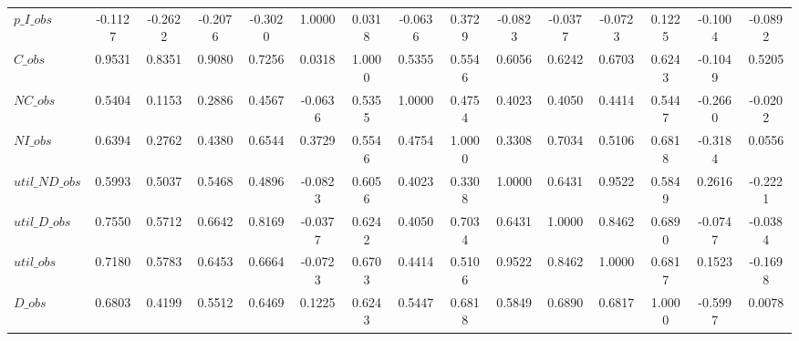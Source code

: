 \begin{center}
\begin{longtable}{lcccccccccccccc}
$p\_I\_obs      $	 & 	          -0.1127	 & 	          -0.2622	 & 	          -0.2076	 & 	          -0.3020	 & 	           1.0000	 & 	           0.0318	 & 	          -0.0636	 & 	           0.3729	 & 	          -0.0823	 & 	          -0.0377	 & 	          -0.0723	 & 	           0.1225	 & 	          -0.1004	 & 	          -0.0892 \\ 
$C\_obs         $	 & 	           0.9531	 & 	           0.8351	 & 	           0.9080	 & 	           0.7256	 & 	           0.0318	 & 	           1.0000	 & 	           0.5355	 & 	           0.5546	 & 	           0.6056	 & 	           0.6242	 & 	           0.6703	 & 	           0.6243	 & 	          -0.1049	 & 	           0.5205 \\ 
$NC\_obs        $	 & 	           0.5404	 & 	           0.1153	 & 	           0.2886	 & 	           0.4567	 & 	          -0.0636	 & 	           0.5355	 & 	           1.0000	 & 	           0.4754	 & 	           0.4023	 & 	           0.4050	 & 	           0.4414	 & 	           0.5447	 & 	          -0.2660	 & 	          -0.0202 \\ 
$NI\_obs        $	 & 	           0.6394	 & 	           0.2762	 & 	           0.4380	 & 	           0.6544	 & 	           0.3729	 & 	           0.5546	 & 	           0.4754	 & 	           1.0000	 & 	           0.3308	 & 	           0.7034	 & 	           0.5106	 & 	           0.6818	 & 	          -0.3184	 & 	           0.0556 \\ 
$util\_ND\_obs  $	 & 	           0.5993	 & 	           0.5037	 & 	           0.5468	 & 	           0.4896	 & 	          -0.0823	 & 	           0.6056	 & 	           0.4023	 & 	           0.3308	 & 	           1.0000	 & 	           0.6431	 & 	           0.9522	 & 	           0.5849	 & 	           0.2616	 & 	          -0.2221 \\ 
$util\_D\_obs   $	 & 	           0.7550	 & 	           0.5712	 & 	           0.6642	 & 	           0.8169	 & 	          -0.0377	 & 	           0.6242	 & 	           0.4050	 & 	           0.7034	 & 	           0.6431	 & 	           1.0000	 & 	           0.8462	 & 	           0.6890	 & 	          -0.0747	 & 	          -0.0384 \\ 
$util\_obs      $	 & 	           0.7180	 & 	           0.5783	 & 	           0.6453	 & 	           0.6664	 & 	          -0.0723	 & 	           0.6703	 & 	           0.4414	 & 	           0.5106	 & 	           0.9522	 & 	           0.8462	 & 	           1.0000	 & 	           0.6817	 & 	           0.1523	 & 	          -0.1698 \\ 
$D\_obs         $	 & 	           0.6803	 & 	           0.4199	 & 	           0.5512	 & 	           0.6469	 & 	           0.1225	 & 	           0.6243	 & 	           0.5447	 & 	           0.6818	 & 	           0.5849	 & 	           0.6890	 & 	           0.6817	 & 	           1.0000	 & 	          -0.5997	 & 	           0.0078 \\ 

\end{longtable}
\end{center}
